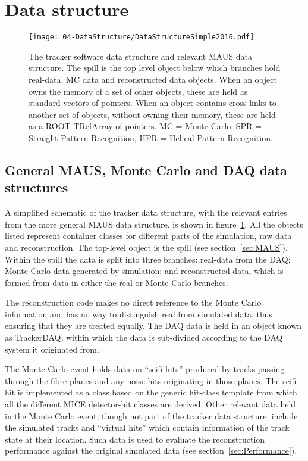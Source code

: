 \section{Data structure}
\label{sec:DataStructure}

\begin{figure}[bt]
  \begin{center}
    \texttt{[image: 04-DataStructure/DataStructureSimple2016.pdf]}
    \caption{\label{figureDataStructure}The tracker software data structure and relevant MAUS data structure.  The spill is the top level object below which branches hold real-data, MC data and reconstructed data objects. When an object owns the memory of a set of other objects, these are held as standard vectors of pointers. When an object contains cross links to another set of objects, without owning their memory, these are held as a ROOT TRefArray of pointers. MC = Monte Carlo, SPR = Straight Pattern Recognition, HPR = Helical Pattern Recognition.}
  \end{center}
\end{figure}

\subsection{General MAUS, Monte Carlo and DAQ data structures}
\label{subsec:GeneralDataStructure}
A simplified schematic of the tracker data structure, with the relevant entries from the more general MAUS data structure, is shown in figure~\ref{figureDataStructure}.  All the objects listed represent container classes for different parts of the simulation, raw data and reconstruction.  The top-level object is the spill (see section~\ref{sec:MAUS}).  Within the spill the data is split into three branches: real-data from the DAQ; Monte Carlo data generated by simulation; and reconstructed data, which is formed from data in either the real or Monte Carlo branches. 

The reconstruction code makes no direct reference to the Monte Carlo information and has no way to distinguish real from simulated data, thus ensuring that they are treated equally.  The DAQ data is held in an object known as TrackerDAQ, within which the data is sub-divided according to the DAQ system it originated from.%

The Monte Carlo event holds data on ``scifi hits'' produced by tracks passing through the fibre planes and any noise hits originating in those planes. The scifi hit is implemented as a class based on the generic hit-class template from which all the different MICE detector-hit classes are derived.  Other relevant data held in the Monte Carlo event, though not part of the tracker data structure, include the simulated tracks and ``virtual hits'' which contain information of the track state at their location. Such data is used to evaluate the reconstruction performance against the original simulated data (see section~\ref{sec:Performance}).


